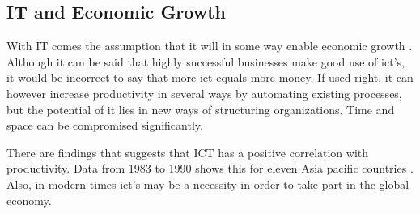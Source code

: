 \subsection{IT and Economic Growth}
With IT comes the assumption that it will in some way enable economic growth \cite{ca:ieeg}.
Although it can be said that highly successful businesses make good use of \gls{ict}'s, it would be incorrect to say that more \gls{ict} equals more money.
If used right, it can however increase productivity in several ways by automating existing processes, but the potential of \gls{it} lies in new ways of structuring organizations.
Time and space can be compromised significantly.

There are findings that suggests that ICT has a positive correlation with productivity. Data from 1983 to 1990 shows this for eleven Asia pacific countries \cite{ca:ieeg}. 
Also, in modern times \gls{ict}'s may be a necessity in order to take part in the global economy.

